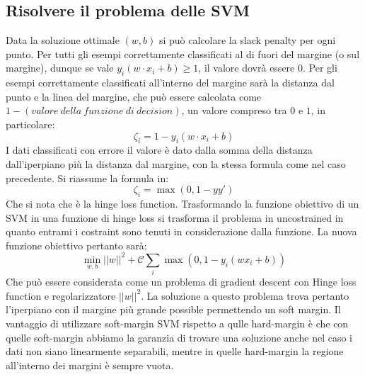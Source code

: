 	\subsection{Risolvere il problema delle SVM}
	Data la soluzione ottimale $(w,b)$ si pu\`o calcolare la slack penalty per ogni punto.
	Per tutti gli esempi correttamente classificati al di fuori del margine (o sul margine), dunque se vale $y_i(w \cdot x_i+b) \ge 1$, il valore dovr\`a essere $0$.
	Per gli esempi correttamente classificati all'interno del margine sar\`a la distanza dal punto e la linea del margine, che pu\`o essere calcolata come $1-(valore\ della\ funzione\ di\ decision)$, un valore compreso tra $0$ e $1$, in particolare:
	$$\zeta_i = 1 - y_i(w \cdot x_i+b)$$
	I dati classificati con errore il valore \`e dato dalla somma della distanza dall'iperpiano pi\`u la distanza dal margine, con la stessa formula come nel caso precedente.
	Si riassume la formula in:
	$$\zeta_i = \max(0,1-yy')$$	
	Che si nota che \`e la hinge loss function.
	Trasformando la funzione obiettivo di un SVM in una funzione di hinge loss si trasforma il problema in uncostrained in quanto entrami i costraint sono tenuti in considerazione dalla funzione.
	La nuova funzione obiettivo pertanto sar\`a:
	$$\min_{w,b}||w||^2+\mathcal{C}\sum_i\max(0,1-y_i(wx_i+b))$$
	Che pu\`o essere considerata come un problema di gradient descent con Hinge loss function e regolarizzatore $||w||^2$.
	La soluzione a questo problema trova pertanto l'iperpiano con il margine pi\`u grande possible permettendo un soft margin. 
	Il vantaggio di utilizzare soft-margin SVM rispetto a qulle hard-margin \`e che con quelle soft-margin abbiamo la garanzia di trovare una soluzione anche nel caso i dati non siano linearmente separabili, mentre in quelle hard-margin la regione all'interno dei margini \`e sempre vuota.


